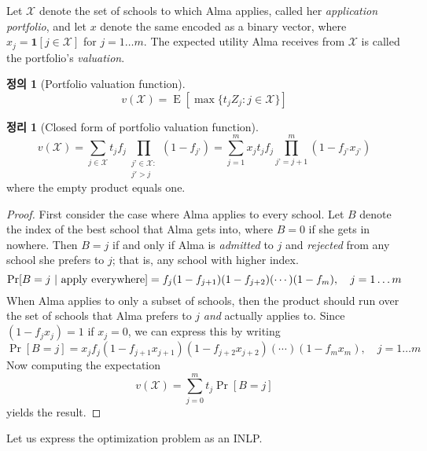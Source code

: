 \documentclass[12pt]{article} %
\newtheorem{theorem}{Theorem}
\theoremstyle{definition}
\newtheorem{definition}{Definition}
\newtheorem{theorem}{정리}
\theoremstyle{definition}
\newtheorem{definition}{정의}
\begin{document}
Let $\mathcal{X}$ denote the set of schools to which Alma applies, called her \emph{application portfolio}, and let $x$ denote the same encoded as a binary vector, where $x_j=\mathbf{1}[j\in \mathcal{X}]$ for $j=1\dots m$. The expected utility Alma receives from $\mathcal{X}$ is called the portfolio’s \emph{valuation}.
\begin{definition}[Portfolio valuation function]
\begin{equation} 
v(\mathcal{X}) = \operatorname{E}\left[ \max\{t_j Z_j : j \in \mathcal{X}\} \right]
\end{equation}
\end{definition}
\begin{theorem}[Closed form of portfolio valuation function]
\begin{equation} \label{closedformportfoliovaluation}
v(\mathcal{X}) = \sum_{j\in \mathcal{X}} t_j f_j  \prod_{\substack{j’ \in \mathcal{X}: \\ j' > j}} (1 - f_{j’}) = \sum_{j=1}^m x_j t_j f_j \prod_{j’ = j+1}^m (1 - f_{j’} x_{j’}) \end{equation}
where the empty product equals one.
\end{theorem}
\begin{proof}
First consider the case where Alma applies to every school. Let $B$ denote the index of the best school that Alma gets into, where $B =0$ if she gets in nowhere. Then $B = j$ if and only if Alma is \emph{admitted} to $j$ and \emph{rejected} from any school she prefers to $j$; that is, any school with higher index.
\begin{equation}
\operatorname{Pr}[B = j\text{~\textbar~apply everywhere}] = f_j (1 - f_{j+1}) (1 - f_{j+2})(\cdots) (1 - f_{m}), \quad j = 1\dots m
\end{equation}
When Alma applies to only a subset of schools, then the product should run over the set of schools that Alma prefers to $j$ \emph{and} actually applies to. Since $(1 - f_{j} x_j) = 1$ if $x_j =0$, we can express this by writing
\begin{equation} \label{probbeqj}
\operatorname{Pr}[B = j] = x_j f_j (1 - f_{j+1} x_{j+1}) (1 - f_{j+2} x_{j+2} )(\cdots) (1 - f_{m} x_m), \quad j = 1\dots m
\end{equation}
Now computing the expectation
\begin{equation}
v(\mathcal{X}) = \sum_{j=0}^m t_j \operatorname{Pr}[B = j]
\end{equation}
yields the result. 
\end{proof}
Let us express the optimization problem as an INLP.
\end{document}
